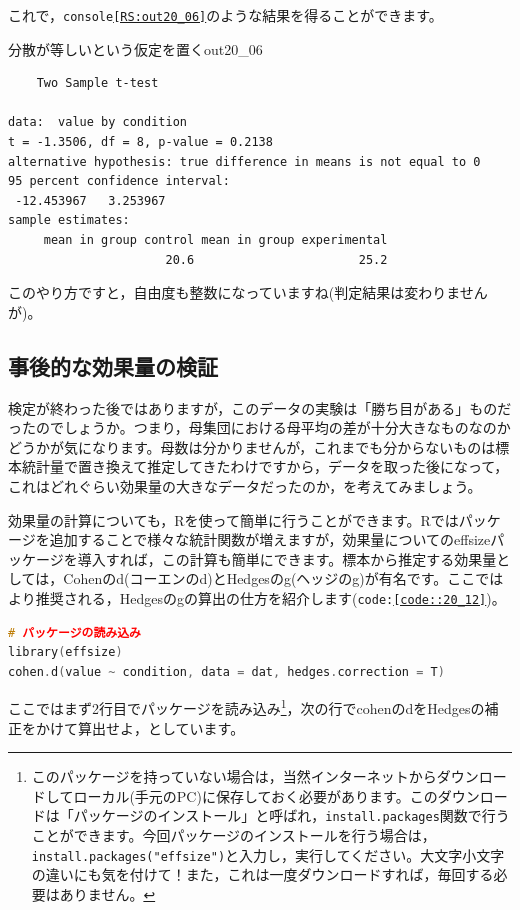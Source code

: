 \documentclass{ltjsbook}
\begin{document}
これで，\texttt{console\ref{RS:out20_06}}のような結果を得ることができます。

\begin{Rscreen}{分散が等しいという仮定を置く}{out20_06}
\begin{verbatim}
	Two Sample t-test

data:  value by condition
t = -1.3506, df = 8, p-value = 0.2138
alternative hypothesis: true difference in means is not equal to 0
95 percent confidence interval:
 -12.453967   3.253967
sample estimates:
     mean in group control mean in group experimental 
                      20.6                       25.2 
\end{verbatim}
\end{Rscreen}
このやり方ですと，自由度も整数になっていますね(判定結果は変わりませんが)。

\subsection{事後的な効果量の検証}
検定が終わった後ではありますが，このデータの実験は「勝ち目がある」ものだったのでしょうか。つまり，母集団における母平均の差が十分大きなものなのかどうかが気になります。母数は分かりませんが，これまでも分からないものは標本統計量で置き換えて推定してきたわけですから，データを取った後になって，これはどれぐらい効果量の大きなデータだったのか，を考えてみましょう。

効果量の計算についても，Rを使って簡単に行うことができます。Rではパッケージを追加することで様々な統計関数が増えますが，効果量についての\textsf{effsize}パッケージ\citep{effsize}を導入すれば，この計算も簡単にできます。標本から推定する効果量としては，Cohenのd(コーエンのd)とHedgesのg(ヘッジのg)が有名です。ここではより推奨される，Hedgesのgの算出の仕方を紹介します(\texttt{code:\ref{code::20_12}})。

\begin{lstlisting}[language=c++,label={code::20_12},caption={効果量を求める}]
# パッケージの読み込み
library(effsize)
cohen.d(value ~ condition, data = dat, hedges.correction = T)
\end{lstlisting}
ここではまず2行目でパッケージを読み込み\footnote{このパッケージを持っていない場合は，当然インターネットからダウンロードしてローカル(手元のPC)に保存しておく必要があります。このダウンロードは「パッケージのインストール」と呼ばれ，\texttt{install.packages}関数で行うことができます。今回パッケージのインストールを行う場合は，\texttt{install.packages("effsize")}と入力し，実行してください。大文字小文字の違いにも気を付けて！また，これは一度ダウンロードすれば，毎回する必要はありません。}，次の行でcohenのdをHedgesの補正をかけて算出せよ，としています。
\end{document}
